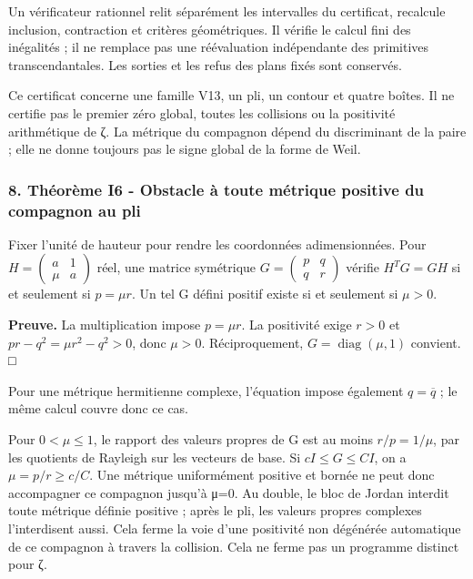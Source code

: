 \documentclass[
  10pt,
  a4paper,
]{article}
\begin{document}
Un vérificateur rationnel relit séparément les intervalles du
certificat, recalcule inclusion, contraction et critères géométriques.
Il vérifie le calcul fini des inégalités ; il ne remplace pas une
réévaluation indépendante des primitives transcendantales. Les sorties
et les refus des plans fixés sont conservés.

Ce certificat concerne une famille V13, un pli, un contour et quatre
boîtes. Il ne certifie pas le premier zéro global, toutes les collisions
ou la positivité arithmétique de ζ. La métrique du compagnon dépend du
discriminant de la paire ; elle ne donne toujours pas le signe global de
la forme de Weil.

\hypertarget{thuxe9oruxe8me-i6---obstacle-uxe0-toute-muxe9trique-positive-du-compagnon-au-pli}{%
\subsubsection{8. Théorème I6 - Obstacle à toute métrique positive du
compagnon au
pli}\label{thuxe9oruxe8me-i6---obstacle-uxe0-toute-muxe9trique-positive-du-compagnon-au-pli}}

Fixer l'unité de hauteur pour rendre les coordonnées adimensionnées.
Pour \(H=\begin{pmatrix}a&1\\\mu&a\end{pmatrix}\) réel, une matrice
symétrique \(G=\begin{pmatrix}p&q\\q&r\end{pmatrix}\) vérifie
\(H^TG=GH\) si et seulement si \(p=\mu r\). Un tel G défini positif
existe si et seulement si \(\mu>0\).

\textbf{Preuve.} La multiplication impose \(p=\mu r\). La positivité
exige \(r>0\) et \(pr-q^2=\mu r^2-q^2>0\), donc \(\mu>0\).
Réciproquement, \(G=\operatorname{diag}(\mu,1)\) convient. □

Pour une métrique hermitienne complexe, l'équation impose également
\(q=\overline q\) ; le même calcul couvre donc ce cas.

Pour \(0<\mu\le1\), le rapport des valeurs propres de G est au moins
\(r/p=1/\mu\), par les quotients de Rayleigh sur les vecteurs de base.
Si \(cI\le G\le CI\), on a \(\mu=p/r\ge c/C\). Une métrique uniformément
positive et bornée ne peut donc accompagner ce compagnon jusqu'à μ=0. Au
double, le bloc de Jordan interdit toute métrique définie positive ;
après le pli, les valeurs propres complexes l'interdisent aussi. Cela
ferme la voie d'une positivité non dégénérée automatique de ce compagnon
à travers la collision. Cela ne ferme pas un programme distinct pour ζ.
\end{document}
